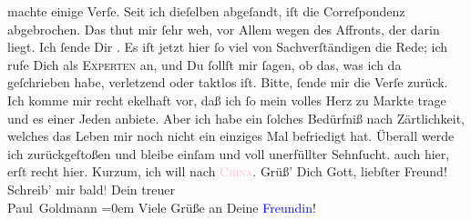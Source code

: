                machte einige Verſe. Seit ich dieſelben abgeſandt, iſt die Correſpondenz abgebrochen.
               Das thut mir ſehr weh, \strikeout{\textcolor{gray}{e}} vor Allem wegen des Affronts, der darin liegt. Ich ſende Dir \label{K_L02836-5v}\label{K_L02836-5h}. Es iſt jetzt hier ſo viel von
               Sachverſtändigen die Rede; ich rufe Dich als \textsc{Experten} an,
               und Du ſollſt mir ſagen, ob das, was ich da geſchrieben habe, verletzend oder taktlos
               iſt. Bitte, ſende mir die Verſe zurück. Ich komme mir recht ekelhaft vor, daß ich ſo
               mein volles Herz zu Markte trage und es einer Jeden anbiete. Aber ich habe ein
               ſolches {\pb}Bedürfniß nach Zärtlichkeit, welches das
               Leben mir noch nicht ein einziges Mal befriedigt hat. Überall werde ich
               zurückgeſtoßen und bleibe einſam und voll unerfüllter Sehnſucht. \label{K_L02836-6v}\label{K_L02836-6h} auch hier,
               erſt recht hier. Kurzum, ich will nach \textsc{\textcolor{pink}{China}{}\ledrightnote{\textcolor{pink}{China}}}.\pend
           \pstart
           Grüß’ Dich Gott, liebſter Freund! Schreib’ mir bald\textcolor{gray}{!}\pend
           \pstart
           Dein treuer {\\[\baselineskip]}\spacefill\mbox{Paul Goldmann}\pend
           \leftskip=0em{}\pstart
           \noindent{}Viele Grüße an Deine \textcolor{blue}{Freundin}{}!\pend
           \endnumbering{}\begin{anhang}\end{anhang}
      